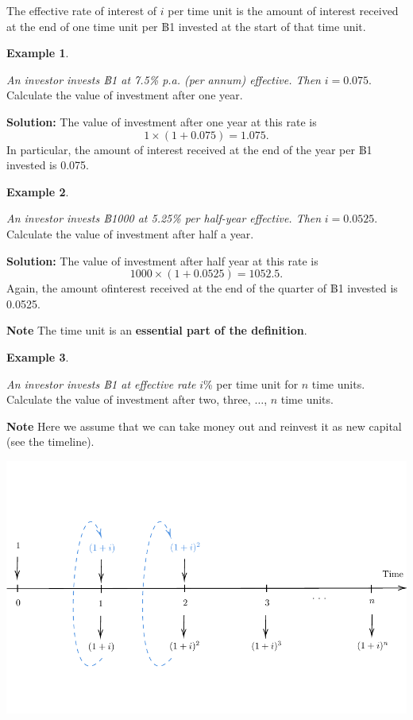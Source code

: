 \documentclass[landscape, 20pt]{extreport}
\theoremstyle{definition}
\theoremstyle{definition}
\newtheorem{example}{Example}[chapter]
\theoremstyle{definition}
\theoremstyle{definition}
\theoremstyle{remark}
\begin{document}
The effective rate of interest of \(i\) per time unit is the amount of
interest received at the end of one time unit per ฿1 invested at the
start of that time unit.

\newpage \begin{example}
\protect\hypertarget{exm:unlabeled-div-8}{}\label{exm:unlabeled-div-8}

\emph{An investor invests ฿1 at 7.5\% p.a. (per annum) effective. Then}
\(i = 0.075\). Calculate the value of investment after one year.

\end{example}

\textbf{Solution:} The value of investment after one year at this rate is
\[1 \times ( 1 + 0.075) = 1.075.\]
In particular, the amount of
interest received at the end of the year per ฿1 invested is 0.075.

\newpage \begin{example}
\protect\hypertarget{exm:unlabeled-div-9}{}\label{exm:unlabeled-div-9}

\emph{An investor invests ฿1000 at 5.25\% per half-year effective. Then}
\(i = 0.0525\). Calculate the value of investment after half a year.

\end{example}

\textbf{Solution:} The value of investment after half year at this rate is
\[1000 \times ( 1 + 0.0525) = 1052.5.\]
Again, the amount ofinterest received at the end of the quarter of ฿1 invested is 0.0525.

\textbf{Note} The time unit is an \textbf{essential part of the definition}.

\newpage \begin{example}
\protect\hypertarget{exm:unlabeled-div-10}{}\label{exm:unlabeled-div-10}

\emph{An investor invests ฿1 at effective rate} \(i\)\% per time unit for \(n\)
time units. Calculate the value of investment after two, three,
\(\ldots\), \(n\) time units.

\end{example}

\textbf{Note} Here we assume that we can take money out and reinvest it as
new capital (see the timeline).

\begin{center}\includegraphics{tikz-ex6-1} \end{center}
\end{document}
